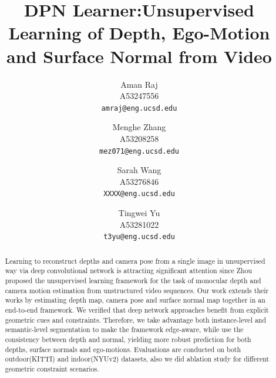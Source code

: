 \documentclass[10pt,twocolumn,letterpaper]{article}
\begin{document}
\title{DPN Learner:Unsupervised Learning of Depth, Ego-Motion and Surface Normal from Video}

\author{Aman Raj\\
A53247556\\
{\tt\small amraj@eng.ucsd.edu}
\and
Menghe Zhang\\
A53208258\\
{\tt\small mez071@eng.ucsd.edu}
\and
Sarah Wang\\
A53276846\\
{\tt\small XXXX@eng.ucsd.edu}
\and
Tingwei Yu\\
A53281022\\
{\tt\small t3yu@eng.ucsd.edu}}

\maketitle

\begin{abstract}

Learning to reconstruct depths and camera pose from a single image in unsupervised way via deep convolutional network is attracting significant attention since Zhou proposed the unsupervised learning framework for the task of monocular depth and camera motion estimation from unstructured video sequences\cite{zhou2017unsupervised}. Our work extends their works by estimating depth map, camera pose and surface normal map together in an end-to-end framework. We verified that deep network approaches benefit from explicit geometric cues and constraints. Therefore, we take advantage both instance-level and semantic-level segmentation to make the framework edge-aware, while use the consistency between depth and normal, yielding more robust prediction for both depths, surface normals and ego-motions. Evaluations are conducted on both outdoor(KITTI) and indoor(NYUv2) datasets, also we did ablation study for different geometric constraint scenarios.  

\end{abstract}

\end{document}
